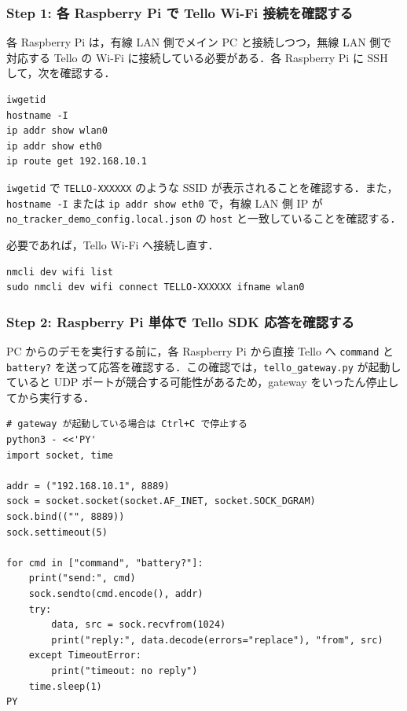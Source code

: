 \subsubsection{Step 1: 各 Raspberry Pi で Tello Wi-Fi 接続を確認する}

各 Raspberry Pi は，有線 LAN 側でメイン PC と接続しつつ，無線 LAN 側で対応する Tello の Wi-Fi に接続している必要がある．各 Raspberry Pi に SSH して，次を確認する．

\begin{lstlisting}
iwgetid
hostname -I
ip addr show wlan0
ip addr show eth0
ip route get 192.168.10.1
\end{lstlisting}

\texttt{iwgetid} で \texttt{TELLO-XXXXXX} のような SSID が表示されることを確認する．また，\texttt{hostname -I} または \texttt{ip addr show eth0} で，有線 LAN 側 IP が \texttt{no\_tracker\_demo\_config.local.json} の \texttt{host} と一致していることを確認する．

必要であれば，Tello Wi-Fi へ接続し直す．

\begin{lstlisting}
nmcli dev wifi list
sudo nmcli dev wifi connect TELLO-XXXXXX ifname wlan0
\end{lstlisting}

\subsubsection{Step 2: Raspberry Pi 単体で Tello SDK 応答を確認する}

PC からのデモを実行する前に，各 Raspberry Pi から直接 Tello へ \texttt{command} と \texttt{battery?} を送って応答を確認する．この確認では，\texttt{tello\_gateway.py} が起動していると UDP ポートが競合する可能性があるため，gateway をいったん停止してから実行する．

\begin{lstlisting}
# gateway が起動している場合は Ctrl+C で停止する
python3 - <<'PY'
import socket, time

addr = ("192.168.10.1", 8889)
sock = socket.socket(socket.AF_INET, socket.SOCK_DGRAM)
sock.bind(("", 8889))
sock.settimeout(5)

for cmd in ["command", "battery?"]:
    print("send:", cmd)
    sock.sendto(cmd.encode(), addr)
    try:
        data, src = sock.recvfrom(1024)
        print("reply:", data.decode(errors="replace"), "from", src)
    except TimeoutError:
        print("timeout: no reply")
    time.sleep(1)
PY
\end{lstlisting}

